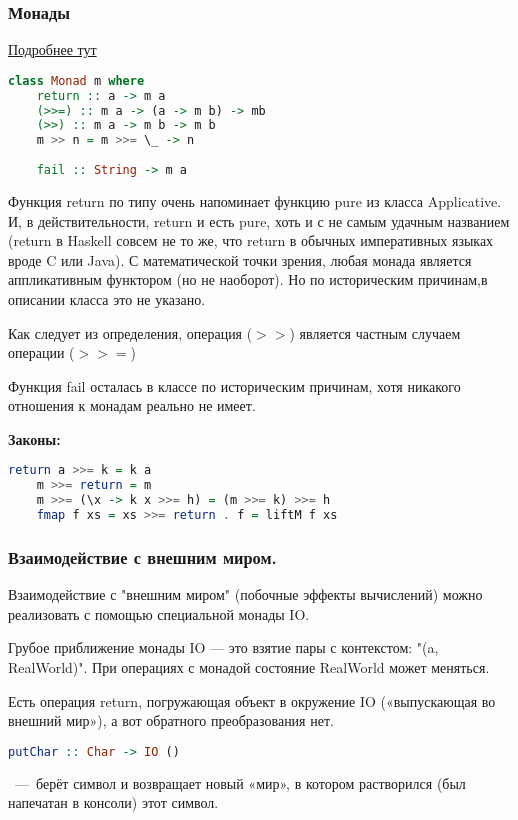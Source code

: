 \subsubsection{Монады}
\href{http://cmc-msu-ai.github.io/haskell-course/lecture/2013/09/08/applicative-and-monad.html}{Подробнее тут}
\begin{lstlisting}[language=Haskell]
	class Monad m where
	return :: a -> m a
	(>>=) :: m a -> (a -> m b) -> mb
	(>>) :: m a -> m b -> m b
	m >> n = m >>= \_ -> n
	
	fail :: String -> m a
\end{lstlisting}

Функция return по типу очень напоминает функцию pure из класса Applicative. И, в действительности, return и есть pure, хоть и с не самым удачным названием (return в Haskell совсем не то же, что return в обычных императивных языках вроде C или Java). С математической точки зрения, любая монада является аппликативным функтором (но не наоборот). Но по историческим причинам,в описании класса это не указано.

Как следует из определения, операция ($>>$) является частным случаем операции ($>>=$)

Функция fail осталась в классе по историческим причинам, хотя никакого отношения к монадам реально не имеет.

\textbf{Законы:}
\begin{lstlisting}[language=Haskell]
	return a >>= k = k a
	m >>= return = m
	m >>= (\x -> k x >>= h) = (m >>= k) >>= h
	fmap f xs = xs >>= return . f = liftM f xs
\end{lstlisting}

\subsubsection{Взаимодействие с внешним миром.}
Взаимодействие с "внешним миром" (побочные эффекты вычислений) можно реализовать с помощью специальной монады IO.

Грубое приближение монады IO — это взятие пары с контекстом: "(a, RealWorld)". При операциях с монадой состояние RealWorld может меняться.

Есть операция return, погружающая объект в окружение IO («выпускающая во внешний мир»), а вот обратного преобразования нет.

\begin{lstlisting}[language=Haskell]
	putChar :: Char -> IO () 
\end{lstlisting}~---~берёт символ и возвращает новый «мир», в котором растворился (был напечатан в консоли) этот символ.

